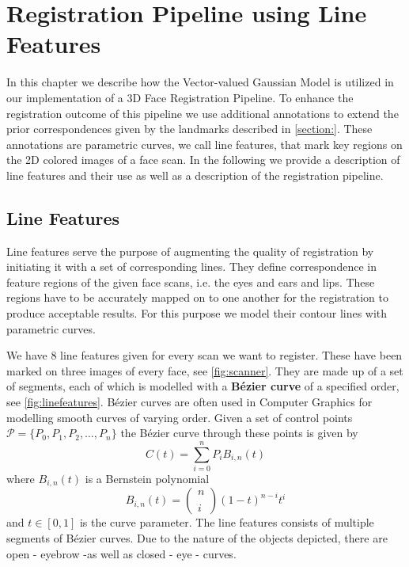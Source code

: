 \chapter{Registration Pipeline using Line Features}
In this chapter we describe how the Vector-valued Gaussian Model is utilized in our implementation of a 3D Face Registration Pipeline. To enhance the registration outcome of this pipeline we use additional annotations to extend the prior correspondences given by the landmarks described in \ref{section:}. These annotations are parametric curves, we call line features, that mark key regions on the 2D colored images of a face scan. In the following we provide a description of line features and their use
as well as a description of the registration pipeline. 

\section{Line Features}
Line features serve the purpose of augmenting the quality of registration by initiating it with a set of corresponding lines. They define correspondence in feature regions of the given face scans, i.e. the eyes and ears and lips. These regions have to be accurately mapped on to one another for the registration to produce acceptable results. For this purpose we model their contour lines with parametric curves. 

We have 8 line features given for every scan we want to register. These have been marked on three images of every face, see \ref{fig:scanner}. They are made up of a set of segments, each of which is modelled with a \textbf{B\'{e}zier curve} of a specified order, see \ref{fig:linefeatures}. B\'{e}zier curves are often used in Computer
Graphics for modelling smooth curves of varying order. Given a set of control points $\mathcal{P} = \{P_{0}, P_{1}, P_{2}, \ldots, P_{n}\}$ the B\'{e}zier curve through these points is given by
\begin{equation}
    C(t)=\sum_{i=0}^{n}P_{i}B_{i,n}(t)
\end{equation}
where $B_{i,n}(t)$ is a Bernstein polynomial 
\begin{equation}
    B_{i,n}(t)=\begin{pmatrix} n \\ \\ i \end{pmatrix}(1-t)^{n-i}t^i
\end{equation}
and $t \in [0,1]$ is the curve parameter. The line features consists of multiple segments of B\'{e}zier curves. Due to the nature of the objects depicted, there are open - eyebrow -as well as closed - eye - curves. 

